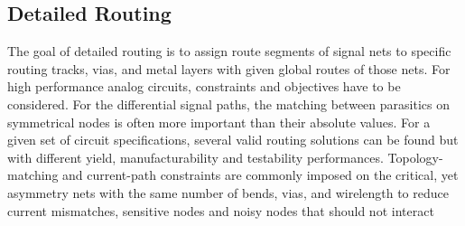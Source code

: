 \subsection{Detailed Routing}
The goal of detailed routing is to assign route segments of signal nets to specific routing tracks, vias, and metal layers with given global routes of those nets. For high performance analog circuits, constraints and objectives have to be considered. For the differential signal paths, the matching between parasitics on symmetrical nodes is often more important than their absolute values. For a given set of circuit specifications, several valid routing solutions can be found but with different yield, manufacturability and testability performances. Topology-matching and current-path constraints are commonly imposed on the critical, yet asymmetry nets with the same number of bends, vias, and wirelength to reduce current mismatches, sensitive nodes and noisy nodes that should not interact